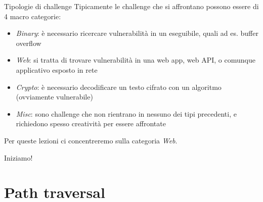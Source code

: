 \documentclass[12pt,handout]{beamer}
\begin{document}
\begin{frame}{Tipologie di challenge}
Tipicamente le challenge che si affrontano possono essere di 4 macro categorie:
\begin{itemize}
    \item \textit{Binary}: è necessario ricercare vulnerabilità in un eseguibile, quali ad es. buffer overflow
    \item \textit{Web}: si tratta di trovare vulnerabilità in una web app, web API, o comunque applicativo esposto in rete
    \item \textit{Crypto}: è necessario decodificare un testo cifrato con un algoritmo (ovviamente vulnerabile)
    \item \textit{Misc}: sono challenge che non rientrano in nessuno dei tipi precedenti, e richiedono spesso creatività per essere affrontate
\end{itemize}

Per queste lezioni ci concentreremo sulla categoria \textit{Web}.
\end{frame}

\begin{frame}
\Huge\center Iniziamo!
\end{frame}

\section{Path traversal}
\end{document}
